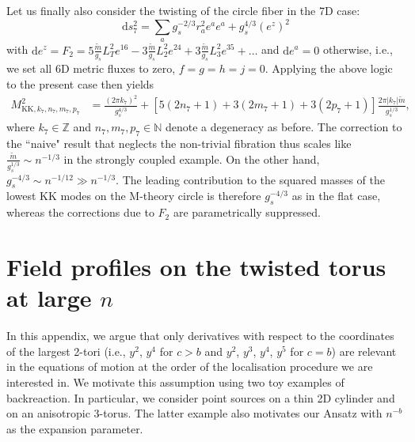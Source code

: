 \documentclass[11pt]{article}
\renewcommand{\[}{\left[}
\renewcommand{\]}{\right]}
\renewcommand{\(}{\left(}
\renewcommand{\)}{\right)}
\renewcommand{\d}{\textrm{d}}
\newcommand{\<}{\langle}
\renewcommand{\>}{\rangle}
\begin{document}
Let us finally also consider the twisting of the circle fiber in the 7D case:
\begin{equation}
\d s_7^2 = \sum_a g_s^{-2/3} r_a^2 e^a e^a + g_s^{4/3} (e^z)^2
\end{equation}
with $\d e^z = F_2 = 5\frac{\tilde m}{g_s} L_T^2 e^{16} - 3 \frac{\tilde m}{g_s} L_2^2 e^{24}+3\frac{\tilde m}{g_s} L_3^2 e^{35}+\ldots$ and $\d e^a =0$ otherwise, i.e., we set all 6D metric fluxes to zero, $f=g=h=j=0$. Applying the above logic to the present case then yields
\begin{align}
M_{\text{KK},k_7,n_7,m_7,p_7}^2 &= \frac{(2\pi k_7)^2}{g_s^{4/3}} + \left[5(2n_7+1)+ 3(2m_7+1)+ 3(2p_7+1)\right] \frac{2\pi|k_7| \tilde m}{g_s^{1/3}},
\end{align}
where $k_7\in\mathbb{Z}$ and $n_7,m_7,p_7\in \mathbb{N}$ denote a degeneracy as before.
The correction to the ``naive" result that neglects the non-trivial fibration thus scales like $\frac{\tilde m}{g_s^{1/3}} \sim n^{-1/3}$ in the strongly coupled example. On the other hand, $g_s^{-4/3}\sim n^{-1/12}\gg n^{-1/3}$. The leading contribution to the squared masses of the lowest KK modes on the M-theory circle is therefore $g_s^{-4/3}$ as in the flat case, whereas the corrections due to $F_2$ are parametrically suppressed.


\section{Field profiles on the twisted torus at large $n$}
\label{App:GreensFunction}

In this appendix, we argue that only derivatives with respect to the coordinates of the largest 2-tori (i.e., $y^2$, $y^4$ for $c>b$ and $y^2$, $y^3$, $y^4$, $y^5$ for $c=b$) are relevant in the equations of motion at the order of the localisation procedure we are interested in. We motivate this assumption using two toy examples of backreaction. In particular, we consider point sources on a thin 2D cylinder and on an anisotropic 3-torus. The latter example also motivates our Ansatz with $n^{-b}$ as the expansion parameter.
\end{document}

